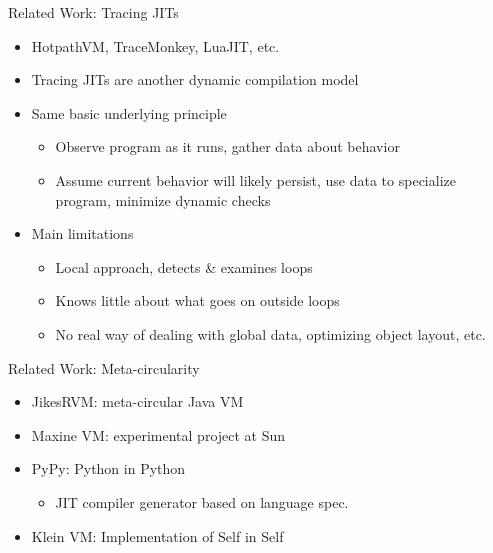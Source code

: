 \begin{frame}{Related Work: Tracing JITs}
    \begin{itemize}
        \item HotpathVM, TraceMonkey, LuaJIT, etc.
        \item Tracing JITs are another dynamic compilation model

        \item Same basic underlying principle
        \begin{itemize}
            \item Observe program as it runs, gather data about behavior
            \item Assume current behavior will likely persist, use data to specialize program, minimize dynamic checks
        \end{itemize}

        \item Main limitations
        \begin{itemize}
            \item Local approach, detects \& examines loops
            \item Knows little about what goes on outside loops
            \item No real way of dealing with global data, optimizing object layout, etc.
        \end{itemize}
    \end{itemize}
\end{frame}

\begin{frame}{Related Work: Meta-circularity}
    \begin{itemize}
        \item JikesRVM: meta-circular Java VM
        \item Maxine VM: experimental project at Sun
        \item PyPy: Python in Python
        \begin{itemize}
            \item JIT compiler generator based on language spec.
        \end{itemize}
        \item Klein VM: Implementation of Self in Self
    \end{itemize}
\end{frame}

